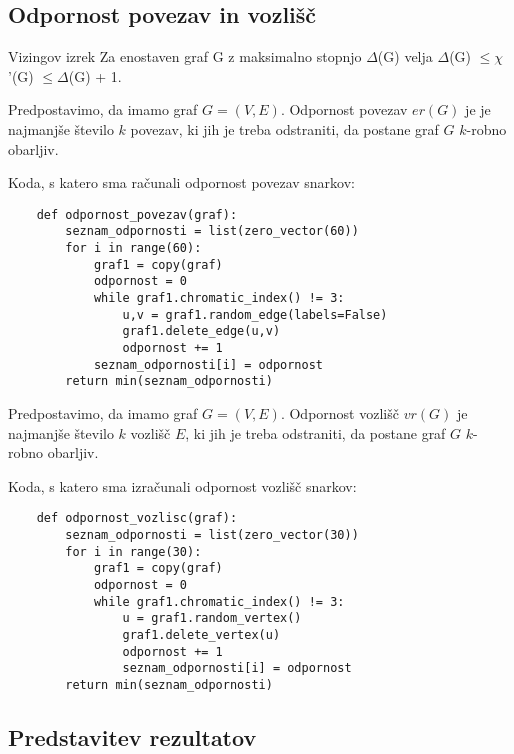 \documentclass[a4paper, 10pt]{article}
\begin{document}
\subsection*{Odpornost povezav in vozlišč}

\begin{theorem}{Vizingov izrek}
    Za enostaven graf G z maksimalno stopnjo $\Delta$(G) velja
    $\Delta$(G) $\leq \chi$'(G) $\leq \Delta$(G) + 1. 
\end{theorem}

\begin{definition}
    Predpostavimo, da imamo graf $G = (V,E)$. Odpornost povezav $er(G)$ je je najmanjše 
    število $k$ povezav, ki jih je treba odstraniti, da postane graf $G$ $k$-robno obarljiv. 
\end{definition}

Koda, s katero sma računali odpornost povezav snarkov:
\begin{lstlisting}
    def odpornost_povezav(graf):
        seznam_odpornosti = list(zero_vector(60))
        for i in range(60):
            graf1 = copy(graf)
            odpornost = 0
            while graf1.chromatic_index() != 3:
                u,v = graf1.random_edge(labels=False)
                graf1.delete_edge(u,v)
                odpornost += 1
            seznam_odpornosti[i] = odpornost
        return min(seznam_odpornosti)
\end{lstlisting}
\pagebreak

\begin{definition}
    Predpostavimo, da imamo graf $G = (V,E)$. Odpornost vozlišč $vr(G)$ je najmanjše število $k$
    vozlišč $E$, ki jih je treba odstraniti, da postane graf $G$ $k$-robno obarljiv.
\end{definition}

Koda, s katero sma izračunali odpornost vozlišč snarkov: 
\begin{lstlisting}
    def odpornost_vozlisc(graf):
        seznam_odpornosti = list(zero_vector(30))
        for i in range(30):
            graf1 = copy(graf)
            odpornost = 0
            while graf1.chromatic_index() != 3:
                u = graf1.random_vertex()
                graf1.delete_vertex(u)
                odpornost += 1
                seznam_odpornosti[i] = odpornost
        return min(seznam_odpornosti)
\end{lstlisting}

\subsection*{Predstavitev rezultatov}
\end{document}
